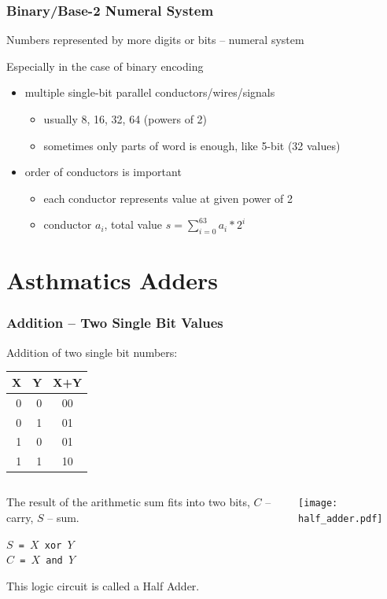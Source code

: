 \documentclass{beamer}
\begin{document}
\begin{frame}
\frametitle{Binary/Base-2 Numeral System}

Numbers represented by more digits or bits -- numeral system

Especially in the case of binary encoding

\begin{itemize}
\item multiple single-bit parallel conductors/wires/signals
\begin{itemize}
\item usually 8, 16, 32, 64 (powers of 2)
\item sometimes only parts of word is enough, like 5-bit (32 values)
\end{itemize}
\item order of conductors is important
\begin{itemize}
\item each conductor represents value at given power of 2
\item conductor $a_{i}$, total value $s = \sum_{i=0}^{63} a_{i}*2^{i}$
\end{itemize}
\end{itemize}

\end{frame}

\section{Asthmatics Adders}

\begin{frame}
\frametitle{Addition -- Two Single Bit Values}

Addition of two single bit numbers:
\begin{tabular}{|r|r|c|}\hline
X & Y & X+Y\\ \hline
0 & 0 & 00\\ \hline
0 & 1 & 01\\ \hline
1 & 0 & 01\\ \hline
1 & 1 & 10\\ \hline
\end{tabular}

\bigskip

\begin{columns}
\begin{column}{0.55\textwidth}
The result of the arithmetic sum fits into two bits, $C$ -- carry, $S$ -- sum.
\bigskip

\texttt{$S$ = $X$ xor $Y$}\\
\texttt{$C$ = $X$ and $Y$}

\bigskip

This logic circuit is called a Half Adder.
\end{column}
\begin{column}{0.45\textwidth}  
\begin{center}
   \texttt{[image: half\_adder.pdf]}
\end{center}
\end{column}
\end{columns}

\end{frame}
\end{document}
